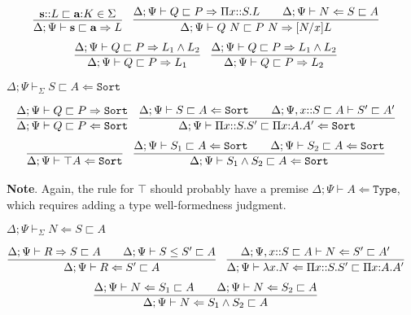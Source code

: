 \documentclass[letterpaper, 11pt]{article}
\newcommand{\Rar}{\Rightarrow}
\newcommand{\Lar}{\Leftarrow}
\newcommand{\Type}{\texttt{Type}}
\newcommand{\Sort}{\texttt{Sort}}
\begin{document}
    \begin{align*}
      & \infer{\Delta ; \Psi \vdash \textbf{s} \sqsubset \textbf{a} \Rar L}
        {
          \textbf{s} {::} L \sqsubset \textbf{a} {:} K \in \Sigma
        } &
      & \infer{\Delta; \Psi \vdash Q \ N \sqsubset P \ N \Rar [N/x]L}
        {
          \Delta ; \Psi \vdash Q \sqsubset P \Rar \Pi x{::}S. L
          &&
          \Delta ; \Psi \vdash N \Lar S \sqsubset A
        }
    \end{align*}
    \begin{align*}
      & \infer{\Delta ; \Psi \vdash Q \sqsubset P \Rar L_1}
        {
          \Delta ; \Psi \vdash Q \sqsubset P \Rar L_1 \land L_2
        } &
      & \infer{\Delta ; \Psi \vdash Q \sqsubset P \Rar L_2}
        {
          \Delta ; \Psi \vdash Q \sqsubset P \Rar L_1 \land L_2
        }
    \end{align*}

    $\boxed{\Delta ; \Psi \vdash_\Sigma S \sqsubset A \Lar \Sort}$

    \begin{align*}
      & \infer{\Delta; \Psi \vdash Q \sqsubset P \Lar \Sort}
        {
          \Delta; \Psi \vdash Q \sqsubset P \Rar \Sort
        } &
      & \infer{\Delta; \Psi \vdash \Pi x{::}S. S' \sqsubset \Pi x{:}A.A' \Lar \Sort}
        {
          \Delta; \Psi \vdash S \sqsubset A \Lar \Sort
          &&
          \Delta; \Psi, x{::}S \sqsubset A \vdash S' \sqsubset A'
        }
    \end{align*}
    \begin{align*}
      & \infer{\Delta; \Psi \vdash \top A \Lar \Sort}{} &
      & \infer{\Delta; \Psi \vdash S_1 \land S_2 \sqsubset A \Lar \Sort}
        {
          \Delta; \Psi \vdash S_1 \sqsubset A \Lar \Sort
          &&
          \Delta; \Psi \vdash S_2 \sqsubset A \Lar \Sort
        }
    \end{align*}

    \textbf{Note}.  Again, the rule for $\top$ should probably have a premise $\Delta; \Psi \vdash A \Lar \Type$, which requires adding
    a type well-formedness judgment.

    $\boxed{ \Delta; \Psi \vdash_\Sigma N \Lar S \sqsubset A}$

    \begin{align*}
      & \infer{\Delta; \Psi \vdash R \Lar S' \sqsubset A}
        {
          \Delta; \Psi \vdash R \Rar S \sqsubset A
          &&
          \Delta; \Psi \vdash S \leq S' \sqsubset A
        } &
      & \infer{\Delta; \Psi \vdash \lambda x.N \Lar \Pi x{::}S.S' \sqsubset \Pi x{:}A.A'}
        {
          \Delta; \Psi, x{::}S \sqsubset A \vdash N \Lar S' \sqsubset A'
        }
    \end{align*}
    \begin{align*}
      & \infer{\Delta; \Psi \vdash N \Lar S_1 \land S_2 \sqsubset A}
        {
          \Delta; \Psi \vdash N \Lar S_1 \sqsubset A
          &&
          \Delta; \Psi \vdash N \Lar S_2 \sqsubset A
        }
    \end{align*}
\end{document}
